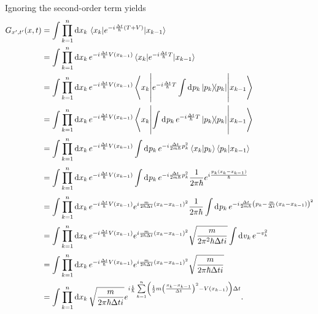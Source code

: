 Ignoring the second-order term yields
\begin{align*}
	G_{x^{\prime}, t^{\prime}}(x, t) &= \int\prod\limits_{k = 1}^{n}\dd{x_{k}}\mel{x_{k}}{e^{-i\frac{\Delta t}{\hbar}(T + V)}}{x_{k - 1}} \\
	                                 &= \int\prod\limits_{k = 1}^{n}\dd{x_{k}}e^{-i\frac{\Delta t}{\hbar}V(x_{k - 1})}\mel{x_{k}}{e^{-i\frac{\Delta t}{\hbar}T}}{x_{k - 1}} \\
	                                 &= \int\prod\limits_{k = 1}^{n}\dd{x_{k}}e^{-i\frac{\Delta t}{\hbar}V(x_{k - 1})}\mel**{x_{k}}{e^{-i\frac{\Delta t}{\hbar}T}\int\limits_{}^{}\dd[]{p_{k}}\op{p_{k}}{p_{k}}}{x_{k - 1}} \\
	                                 &= \int\prod\limits_{k = 1}^{n}\dd{x_{k}}e^{-i\frac{\Delta t}{\hbar}V(x_{k - 1})}\mel**{x_{k}}{\int\limits_{}^{}\dd[]{p_{k}}e^{-i\frac{\Delta t}{\hbar}T}\op{p_{k}}{p_{k}}}{x_{k - 1}} \\
	                                 &= \int\prod\limits_{k = 1}^{n}\dd{x_{k}}e^{-i\frac{\Delta t}{\hbar}V(x_{k - 1})}\int\limits_{}^{}\dd[]{p_{k}}e^{-i\frac{\Delta t}{2m\hbar}p_{k}^{2}}\braket{x_{k}}{p_{k}}\braket{p_{k}}{x_{k - 1}} \\
	                                 &= \int\prod\limits_{k = 1}^{n}\dd{x_{k}}e^{-i\frac{\Delta t}{\hbar}V(x_{k - 1})}\int\limits_{}^{}\dd[]{p_{k}}e^{-i\frac{\Delta t}{2m\hbar}p_{k}^{2}}\frac{1}{2\pi\hbar}e^{i\frac{p_{k}(x_{k} - x_{k - 1})}{\hbar}} \\
	                                 &= \int\prod\limits_{k = 1}^{n}\dd{x_{k}}e^{-i\frac{\Delta t}{\hbar}V(x_{k - 1})}e^{i\frac{m}{2\hbar\Delta t}(x_{k} - x_{k - 1})^{2}}\frac{1}{2\pi\hbar}\int\limits_{}^{}\dd[]{p_{k}}e^{-i\frac{\Delta t}{2m\hbar}\left(p_{k} - \frac{m}{\Delta t}(x_{k} - x_{k - 1})\right)^{2}} \\
	                                 &= \int\prod\limits_{k = 1}^{n}\dd{x_{k}}e^{-i\frac{\Delta t}{\hbar}V(x_{k - 1})}e^{i\frac{m}{2\hbar\Delta t}(x_{k} - x_{k - 1})^{2}}\sqrt{\frac{m}{2\pi^{2}\hbar\Delta ti}}\int\limits_{}^{}\dd[]{v_{k}}e^{-v_{k}^{2}} \\
	                                 &= \int\prod\limits_{k = 1}^{n}\dd{x_{k}}e^{-i\frac{\Delta t}{\hbar}V(x_{k - 1})}e^{i\frac{m}{2\hbar\Delta t}(x_{k} - x_{k - 1})^{2}}\sqrt{\frac{m}{2\pi\hbar\Delta ti}} \\
	                                 &= \int\prod\limits_{k = 1}^{n}\dd{x_{k}}\sqrt{\frac{m}{2\pi\hbar\Delta ti}}e^{i\frac{1}{\hbar}\sum\limits_{k = 1}^{n}\left(\frac{1}{2}m\left(\frac{x_{k} - x_{k - 1}}{\Delta t}\right)^{2} - V(x_{k - 1})\right)\Delta t}.
\end{align*}

